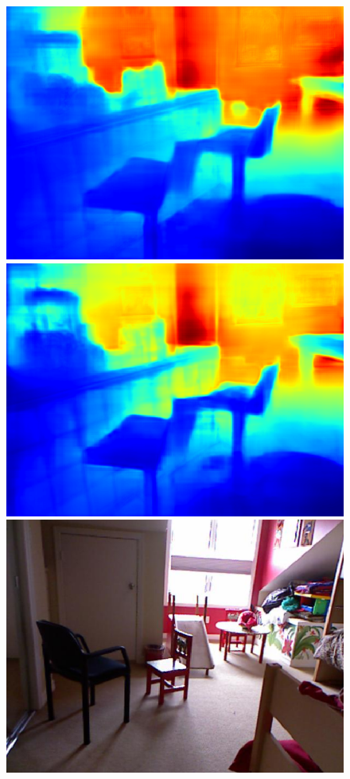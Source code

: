 \documentclass{svjour3}                     %
\begin{document}
\begin{figure}[t]
{\begin{minipage}[t]{0.15\linewidth}
  \includegraphics[width=1\linewidth]{images/nyu_result/playroom_rgb_00431.png}
  \includegraphics[width=1\linewidth]{images/nyu_without/playroom_rgb_00431.png}
  \includegraphics[width=1\linewidth]{images/nyu_rgb/1078.png}

\end{minipage}}
\end{figure}
\end{document}
